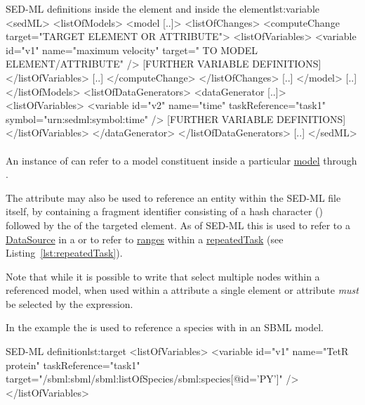 \begin{myXmlLst}{SED-ML  definitions inside the  element and inside the  element}{lst:variable}
<sedML>
	<listOfModels>
		<model [..]>
			<listOfChanges>
				<computeChange target="TARGET ELEMENT OR ATTRIBUTE">
				<listOfVariables>
				   <variable id="v1" name="maximum velocity" target=" TO MODEL ELEMENT/ATTRIBUTE" />
				   [FURTHER VARIABLE DEFINITIONS]
				</listOfVariables>
				[..]
				</computeChange>
			</listOfChanges>
			[..]
		</model>
		[..]
	</listOfModels>
	<listOfDataGenerators>
		<dataGenerator [..]>
			<listOfVariables>
				<variable id="v2" name="time" taskReference="task1" symbol="urn:sedml:symbol:time" />
				[FURTHER VARIABLE DEFINITIONS]
			</listOfVariables>
		</dataGenerator>
	</listOfDataGenerators>
	[..]
</sedML>
\end{myXmlLst}


\paragraph*{}
\label{sec:target}
An instance of \Variable can refer to a model constituent inside a particular \hyperref[class:model]{model} through . 

The  attribute may also be used to reference an entity within the SED-ML file itself, by containing a fragment identifier consisting of a hash character (\code{\#}) followed by the \SId of the targeted element. As of SED-ML \currentLV this is used to refer to a \hyperref[class:dataSource]{DataSource} in a \Variable or to refer to \hyperref[class:listOfRanges]{ranges} within a \hyperref[class:repeatedTask]{repeatedTask} (see Listing~\ref{lst:repeatedTask}).

Note that while it is possible to write  that select multiple nodes within a referenced model, when used within a  attribute a single element or attribute \emph{must} be selected by the expression.

In the example the  is used to reference a species with  in an SBML model.
\begin{myXmlLst}{SED-ML  definition}{lst:target}
<listOfVariables>
	<variable id="v1" name="TetR protein" taskReference="task1" 
		target="/sbml:sbml/sbml:listOfSpecies/sbml:species[@id='PY']" />
</listOfVariables>
\end{myXmlLst}

